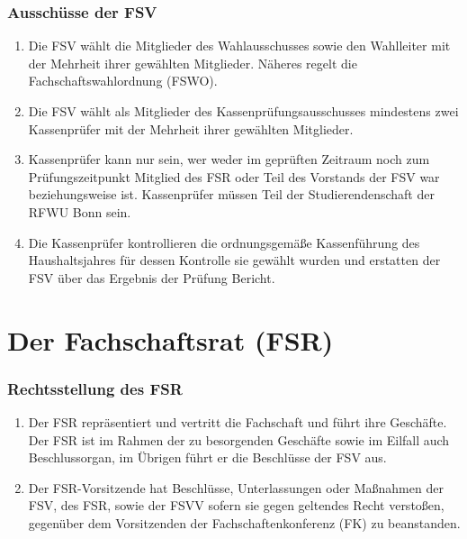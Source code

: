 \documentclass{article}
\begin{document}
\section{Ausschüsse der FSV}
\begin{enumerate}[(1)]
    \item Die FSV wählt die Mitglieder des Wahlausschusses sowie den Wahlleiter mit der Mehrheit ihrer gewählten Mitglieder. Näheres regelt die Fachschaftswahlordnung (FSWO).
    \item Die FSV wählt als Mitglieder des Kassenprüfungsausschusses mindestens zwei Kassenprüfer mit der Mehrheit ihrer gewählten Mitglieder.
    \item Kassenprüfer kann nur sein, wer weder im geprüften Zeitraum noch zum Prüfungszeitpunkt Mitglied des FSR oder Teil des Vorstands der FSV war beziehungsweise ist. Kassenprüfer müssen Teil der Studierendenschaft der RFWU Bonn sein.
    \item Die Kassenprüfer kontrollieren die ordnungsgemäße Kassenführung des Haushaltsjahres für dessen Kontrolle sie gewählt wurden und erstatten der FSV über das Ergebnis der Prüfung Bericht.
\end{enumerate}

\part{Der Fachschaftsrat (FSR)}
\section{Rechtsstellung des FSR}
\begin{enumerate}[(1)]
    \item Der FSR repräsentiert und vertritt die Fachschaft und führt ihre Geschäfte. Der FSR ist im Rahmen der zu besorgenden Geschäfte sowie im Eilfall auch Beschlussorgan, im Übrigen führt er die Beschlüsse der FSV aus.
    \item Der FSR-Vorsitzende hat Beschlüsse, Unterlassungen oder Maßnahmen der FSV, des FSR, sowie der FSVV sofern sie gegen geltendes Recht verstoßen, gegenüber dem Vorsitzenden der Fachschaftenkonferenz (FK) zu beanstanden.
\end{enumerate}
\end{document}
